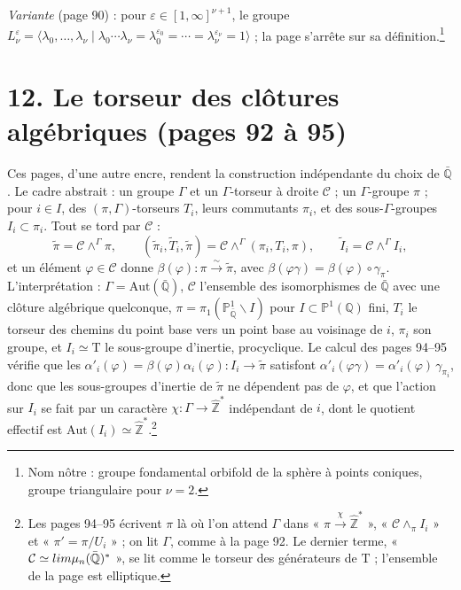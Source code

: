 \documentclass[11pt,a4paper]{article}
\begin{document}
\emph{Variante} (page 90) : pour $\varepsilon \in [1, \infty]^{\nu+1}$, le groupe
$L_{\nu}^{\varepsilon} = \langle \lambda_{0}, \ldots, \lambda_{\nu} \mid \lambda_{0}
\cdots \lambda_{\nu} = \lambda_{0}^{\varepsilon_{0}} = \cdots =
\lambda_{\nu}^{\varepsilon_{\nu}} = 1\rangle$ ; la page s'arrête sur sa
définition.\footnote{Nom nôtre : groupe fondamental orbifold de la sphère à
points coniques, groupe triangulaire pour $\nu = 2$.}

\section*{12. Le torseur des clôtures algébriques (pages 92 à 95)}

Ces pages, d'une autre encre, rendent la construction indépendante du choix
de $\bar{\mathbb{Q}}$. Le cadre abstrait : un groupe $\Gamma$ et un
$\Gamma$-torseur à droite $\mathcal{C}$ ; un $\Gamma$-groupe $\pi$ ; pour $i \in
I$, des $(\pi, \Gamma)$-torseurs $T_{i}$, leurs commutants $\pi_{i}$, et des
sous-$\Gamma$-groupes $I_{i} \subset \pi_{i}$. Tout se tord par $\mathcal{C}$ :
\[
\widetilde{\pi} = \mathcal{C} \wedge^{\Gamma} \pi, \qquad
(\widetilde{\pi}_{i}, \widetilde{T}_{i}, \widetilde{\pi}) = \mathcal{C}
\wedge^{\Gamma} (\pi_{i}, T_{i}, \pi), \qquad
\widetilde{I}_{i} = \mathcal{C} \wedge^{\Gamma} I_{i},
\]
et un élément $\varphi \in \mathcal{C}$ donne $\beta(\varphi) : \pi
\xrightarrow{\sim} \widetilde{\pi}$, avec $\beta(\varphi\gamma) = \beta(\varphi)
\circ \gamma_{\pi}$. L'interprétation : $\Gamma = \mathrm{Aut}(\bar{\mathbb{Q}})$,
$\mathcal{C}$ l'ensemble des isomorphismes de $\bar{\mathbb{Q}}$ avec une
clôture algébrique quelconque, $\pi = \pi_{1}(\mathbb{P}^{1}_{\bar{\mathbb{Q}}}
\smallsetminus I)$ pour $I \subset \mathbb{P}^{1}(\mathbb{Q})$ fini, $T_{i}$ le
torseur des chemins du point base vers un point base au voisinage de $i$,
$\pi_{i}$ son groupe, et $I_{i} \simeq \mathrm{T}$ le sous-groupe d'inertie,
procyclique. Le calcul des pages 94--95 vérifie que les
$\alpha'_{i}(\varphi) = \beta(\varphi) \alpha_{i}(\varphi) : I_{i} \to
\widetilde{\pi}$ satisfont $\alpha'_{i}(\varphi\gamma) = \alpha'_{i}(\varphi)\,
\gamma_{\pi_{i}}$, donc que les sous-groupes d'inertie de $\widetilde{\pi}$ ne
dépendent pas de $\varphi$, et que l'action sur $I_{i}$ se fait par un
caractère $\chi : \Gamma \to \widehat{\mathbb{Z}}^{*}$ indépendant de $i$, dont le
quotient effectif est $\mathrm{Aut}(I_{i}) \simeq
\widehat{\mathbb{Z}}^{*}$.\footnote{Les pages 94--95 écrivent $\pi$ là où l'on
attend $\Gamma$ dans « $\pi \xrightarrow{\chi} \widehat{\mathbb{Z}}^{*}$ »,
« $\mathcal{C} \wedge_{\pi} I_{i}$ » et « $\pi' = \pi/U_{i}$ » ; on lit $\Gamma$,
comme à la page 92. Le dernier terme, « $\mathcal{C} \simeq \varprojlim
\mu_{n}(\bar{\mathbb{Q}})^{*}$ », se lit comme le torseur des générateurs de
$\mathrm{T}$ ; l'ensemble de la page est elliptique.}
\end{document}
